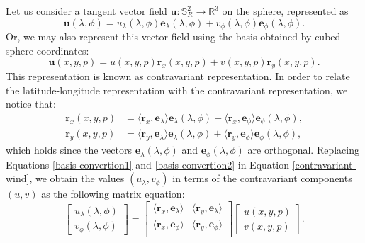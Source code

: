 Let us consider a tangent vector field $\boldsymbol{u}: \mathbb{S}^2_R \to 
\mathbb{R}^3$ on the sphere, represented as
\begin{equation}
	\label{latlon-wind}
	\boldsymbol{u}(\lambda, \phi) = 
    u_{\lambda} (\lambda, \phi) \boldsymbol{e}_{\lambda} (\lambda, \phi) + 
	v_{\phi} (\lambda, \phi) \boldsymbol{e}_{\phi} (\lambda, \phi). 
\end{equation}
Or, we may also represent this vector field using the basis 
obtained by cubed-sphere coordinates:
\begin{equation}
	\label{contravariant-wind}
	\boldsymbol{u}(x, y, p) = 
	{u}(x, y, p) \boldsymbol{r}_{x}(x, y, p) + 
	{v}(x, y, p) \boldsymbol{r}_{y}(x, y, p).
\end{equation}
This representation is known as contravariant representation.
In order to relate the latitude-longitude representation
with the contravariant representation, we notice that:
\begin{align}
	\label{basis-convertion1}
	\boldsymbol{r}_x(x, y, p) &= 
	\langle \boldsymbol{r}_{x} , \boldsymbol{e}_{\lambda}\rangle
	\boldsymbol{e}_{\lambda} (\lambda, \phi)  
	+ \langle \boldsymbol{r}_{x} , \boldsymbol{e}_{\phi}\rangle
	\boldsymbol{e}_{\phi} (\lambda, \phi), \\
	\label{basis-convertion2}
	\boldsymbol{r}_y(x, y, p) &=  
	\langle \boldsymbol{r}_{y} , \boldsymbol{e}_{\lambda}\rangle
	  \boldsymbol{e}_{\lambda} (\lambda, \phi) 
	+ \langle \boldsymbol{r}_{y} , \boldsymbol{e}_{\phi}\rangle
	\boldsymbol{e}_{\phi} (\lambda, \phi), 
\end{align}
which holds since the vectors $\boldsymbol{e}_{\lambda}(\lambda, \phi)$ and
$\boldsymbol{e}_{\phi}(\lambda, \phi)$ are orthogonal.
Replacing Equations \eqref{basis-convertion1} and \eqref{basis-convertion2}
in Equation \eqref{contravariant-wind}, we obtain the values $(u_\lambda, v_\phi)$
in terms of the contravariant components $({u},{v})$ 
as the following matrix equation:
\begin{equation}
	\label{ll-to-contravariant}
	\begin{bmatrix}
		 u_\lambda (\lambda, \phi) \\
		 v_\phi (\lambda, \phi) 
	\end{bmatrix}
	=
	\begin{bmatrix}
		\langle \boldsymbol{r}_x, \boldsymbol{e}_\lambda \rangle 
		& \langle \boldsymbol{r}_y, \boldsymbol{e}_\lambda \rangle \\
		\langle \boldsymbol{r}_x, \boldsymbol{e}_\phi \rangle 
		& \langle \boldsymbol{r}_y, \boldsymbol{e}_\phi \rangle \\
	\end{bmatrix}
	\begin{bmatrix}
		{u}(x,y,p) \\
		{v}(x,y,p)
	\end{bmatrix}.
\end{equation}

